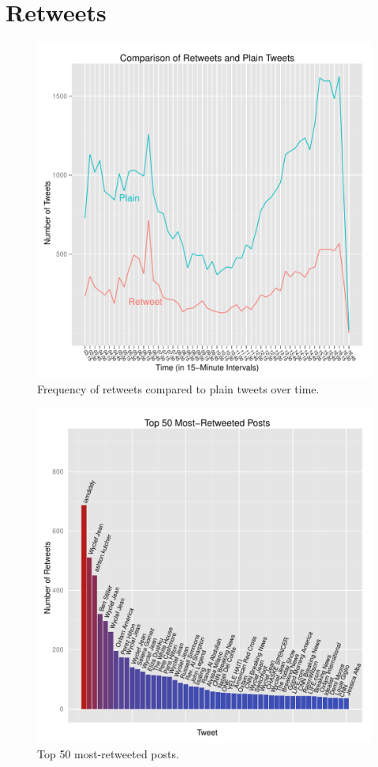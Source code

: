 \documentclass[a4paper, 11pt, titlepage]{article}
\begin{document}
\section{Retweets}

\begin{figure}[h]
\centering
\label{fig:rt_compare_over_time}
\includegraphics[width=120mm]{../figures/rt_compare_over_time}
\caption{Frequency of retweets compared to plain tweets over time.}
\end{figure}

\begin{figure}[h]
\centering
\label{fig:rt_top_50}
\includegraphics[width=120mm]{../figures/rt_top_50}
\caption{Top 50 most-retweeted posts.}
\end{figure}
\end{document}
